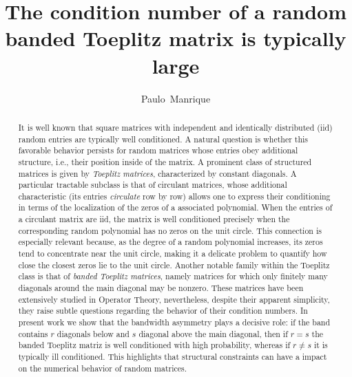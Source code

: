 \documentclass[12pt]{amsart}
\title[Random banded Toeplitz matrix and random polynomial]{The condition number of a random banded Toeplitz matrix is typically large}
\author{Paulo~Manrique\orcidlink{00000-0002-4908-5514}}
\theoremstyle{plain}
\numberwithin{equation}{section}
\newcommand{\<}{\langle}
\renewcommand{\>}{\rangle}
\begin{document}
\begin{abstract}
It is well known that square matrices with independent and identically distributed (iid) random entries are typically well conditioned. A natural question is whether this favorable behavior persists for random matrices whose entries obey additional structure, i.e., their position inside of the matrix. A prominent class of structured matrices is given by {\it Toeplitz matrices}, characterized by constant diagonals. A particular tractable subclass is that of circulant matrices, whose additional characteristic (its entries {\it circulate} row by row) allows one to express their conditioning in terms of the localization of the zeros of a associated polynomial. When the entries of a circulant matrix are iid, the matrix is well conditioned precisely when the corresponding random polynomial has no zeros on the unit circle. This connection is especially relevant because, as the degree of a random polynomial increases, its zeros tend to concentrate near the unit circle, making it a delicate problem to quantify how close the closest zeros lie to the unit circle. Another notable family within the Toeplitz class is that of {\it banded Toeplitz matrices}, namely matrices for which only finitely many diagonals around the main diagonal may be nonzero. These matrices have been extensively studied in Operator Theory, nevertheless, despite their apparent simplicity, they raise subtle questions regarding the behavior of their condition numbers. In present work we show that the bandwidth asymmetry plays a decisive role: if the band contains $r$ diagonals below and $s$ diagonal above the main diagonal, then if $r=s$ the banded Toeplitz matriz is well conditioned with high probability, whereas if $r\neq s$ it is typically ill conditioned. This highlights that structural constraints can have a impact on the numerical behavior of random matrices.


\end{abstract}
\end{document}
